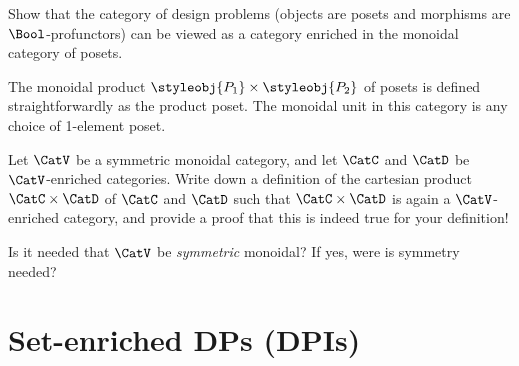 \begin{gradedexercise}
	\label{ex:DPIsEnrichedInPos}
	Show that the category of design problems (objects are posets and morphisms are $\Bool$-profunctors) can be viewed as a category enriched in the monoidal category of posets.



	The monoidal product $\styleobj{P_1} \times \styleobj{P_2}$ of posets is defined straightforwardly as the product poset.
	The monoidal unit in this category is any choice of 1-element poset.
\end{gradedexercise}


\begin{gradedexercise}
	\label{ex:ProductOfEnrichedCats}
	Let $\CatV$ be a symmetric monoidal category, and let $\CatC$ and $\CatD$ be $\CatV$-enriched categories.
	Write down a definition of the cartesian product $\CatC \times \CatD$ of $\CatC$ and $\CatD$ such that $\CatC \times \CatD$ is again a $\CatV$-enriched category, and provide a proof that this is indeed true for your definition!

	Is it needed that $\CatV$ be \emph{symmetric} monoidal?
	If yes, were is symmetry needed?
\end{gradedexercise}

\section{Set-enriched DPs (DPIs)}

